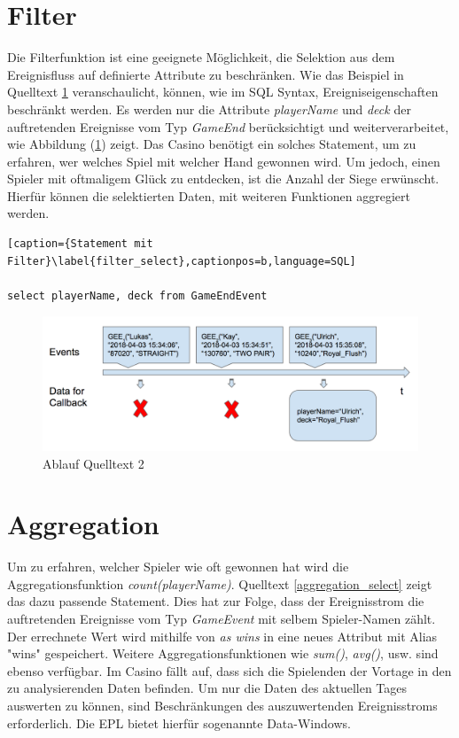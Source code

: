 \section{Filter}

Die Filterfunktion ist eine geeignete Möglichkeit, die Selektion aus dem Ereignisfluss auf definierte Attribute zu beschränken. Wie das Beispiel in Quelltext \ref{filter_select} veranschaulicht, können, wie im SQL Syntax, Ereigniseigenschaften beschränkt werden.
Es werden nur die Attribute \textit{playerName} und \textit{deck} der auftretenden Ereignisse vom Typ \textit{GameEnd} berücksichtigt und weiterverarbeitet, wie Abbildung (\ref{filter_select}) zeigt.
Das Casino benötigt ein solches Statement, um zu erfahren, wer welches Spiel mit welcher Hand gewonnen wird. Um jedoch, einen Spieler mit oftmaligem Glück zu entdecken, ist die Anzahl der Siege erwünscht. Hierfür können die selektierten Daten, mit weiteren Funktionen aggregiert werden.

\begin{lstlisting}[caption={Statement mit Filter}\label{filter_select},captionpos=b,language=SQL]

select playerName, deck from GameEndEvent

\end{lstlisting}

\begin{figure}[ht]
	\centering
	\includegraphics[width=\textwidth,height=\textheight, keepaspectratio]{images/statement_basic_filter.png}
	\caption{Ablauf Quelltext 2}
	\label{filter_select}
\end{figure}

\section{Aggregation}

Um zu erfahren, welcher Spieler wie oft gewonnen hat wird die Aggregationsfunktion \textit{count(playerName)}. Quelltext \ref{aggregation_select} zeigt das dazu passende Statement. Dies hat zur Folge, dass der Ereignisstrom die auftretenden Ereignisse vom Typ \textit{GameEvent} mit selbem Spieler-Namen zählt. Der errechnete Wert wird mithilfe von \textit{as wins} in eine neues Attribut mit Alias "wins" gespeichert. Weitere Aggregationsfunktionen wie \textit{sum()}, \textit{avg()}, usw. sind ebenso verfügbar.
Im Casino fällt auf, dass sich die Spielenden der Vortage in den zu analysierenden Daten befinden. Um nur die Daten des aktuellen Tages auswerten zu können, sind Beschränkungen des auszuwertenden Ereignisstroms erforderlich. Die \acf{EPL} bietet hierfür sogenannte Data-Windows.

